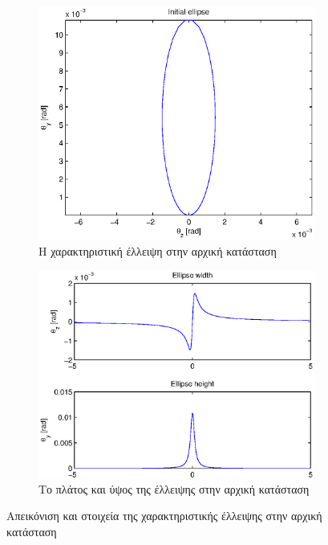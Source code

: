 \begin{figure}[tph]	
	\begin{subfigure}{0.47\textwidth}
		\includegraphics[width=\linewidth]{figures/beam-deflection-script-01-initial-elipse}
		\centering
		\caption{Η χαρακτηριστική έλλειψη στην αρχική κατάσταση}
		\label{fig:beam-deflection-script-01-initial-elipse}
	\end{subfigure}
	\hfill
	\begin{subfigure}{0.47\textwidth}
		\includegraphics[width=\linewidth]{figures/beam-deflection-script-02-elipse-width}
		\centering
		\caption{Το πλάτος και ύψος της έλλειψης στην αρχική κατάσταση}
		\label{fig:beam-deflection-script-02-elipse-width}
	\end{subfigure}
\caption{Απεικόνιση και στοιχεία της χαρακτηριστικής έλλειψης στην αρχική κατάσταση}
\label{fig:initial-ellipse}
\end{figure}

